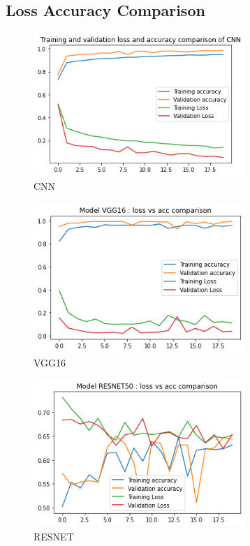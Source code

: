 \documentclass[conference]{IEEEtran}
\begin{document}
\subsection{Loss Accuracy Comparison}
\begin{figure}[htbp]
        \centerline{\includegraphics[width=8cm]{CNN.png}}
        \caption{CNN}
        \label{output}
    \end{figure}

\begin{figure}[htbp]
        \centerline{\includegraphics[width=8cm]{VGG.png}}
        \caption{VGG16}
        \label{output}
    \end{figure}
 
\begin{figure}[htbp]
        \centerline{\includegraphics[width=8cm]{RESNET.png}}
        \caption{RESNET}
        \label{output}
    \end{figure}  
    
\end{document}
